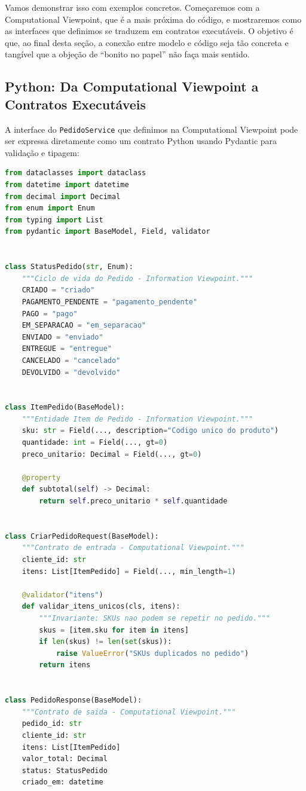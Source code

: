 Vamos demonstrar isso com exemplos concretos. Começaremos com a Computational
Viewpoint, que é a mais próxima do código, e mostraremos como as interfaces
que definimos se traduzem em contratos executáveis. O objetivo é que, ao final
desta seção, a conexão entre modelo e código seja tão concreta e tangível que
a objeção de ``bonito no papel'' não faça mais sentido.

\subsection{Python: Da Computational Viewpoint a Contratos Executáveis}

A interface do \texttt{PedidoService} que definimos na Computational Viewpoint
pode ser expressa diretamente como um contrato Python usando Pydantic para
validação e tipagem:

\begin{lstlisting}[language=Python, caption={Modelos de domínio derivados da Information Viewpoint}]
from dataclasses import dataclass
from datetime import datetime
from decimal import Decimal
from enum import Enum
from typing import List
from pydantic import BaseModel, Field, validator


class StatusPedido(str, Enum):
    """Ciclo de vida do Pedido - Information Viewpoint."""
    CRIADO = "criado"
    PAGAMENTO_PENDENTE = "pagamento_pendente"
    PAGO = "pago"
    EM_SEPARACAO = "em_separacao"
    ENVIADO = "enviado"
    ENTREGUE = "entregue"
    CANCELADO = "cancelado"
    DEVOLVIDO = "devolvido"


class ItemPedido(BaseModel):
    """Entidade Item de Pedido - Information Viewpoint."""
    sku: str = Field(..., description="Codigo unico do produto")
    quantidade: int = Field(..., gt=0)
    preco_unitario: Decimal = Field(..., gt=0)

    @property
    def subtotal(self) -> Decimal:
        return self.preco_unitario * self.quantidade


class CriarPedidoRequest(BaseModel):
    """Contrato de entrada - Computational Viewpoint."""
    cliente_id: str
    itens: List[ItemPedido] = Field(..., min_length=1)

    @validator("itens")
    def validar_itens_unicos(cls, itens):
        """Invariante: SKUs nao podem se repetir no pedido."""
        skus = [item.sku for item in itens]
        if len(skus) != len(set(skus)):
            raise ValueError("SKUs duplicados no pedido")
        return itens


class PedidoResponse(BaseModel):
    """Contrato de saida - Computational Viewpoint."""
    pedido_id: str
    cliente_id: str
    itens: List[ItemPedido]
    valor_total: Decimal
    status: StatusPedido
    criado_em: datetime
\end{lstlisting}


